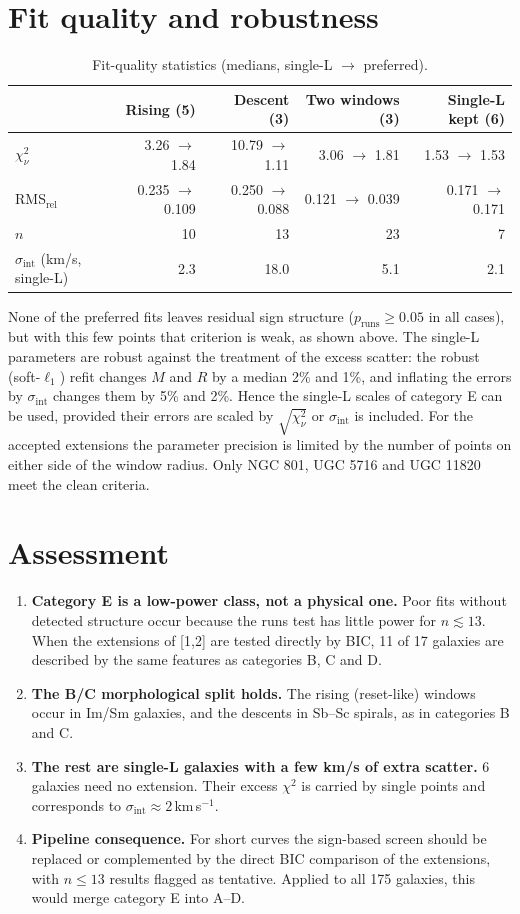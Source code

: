 \documentclass[10pt]{article}
\begin{document}
\section{Fit quality and robustness}
\begin{table}[h]\centering\small\caption{Fit-quality statistics (medians, single-L $\to$ preferred).}\begin{tabular}{lrrrr}\toprule & Rising (5) & Descent (3) & Two windows (3) & Single-L kept (6)\\\midrule
$\chi^2_\nu$ & 3.26 $\to$ 1.84 & 10.79 $\to$ 1.11 & 3.06 $\to$ 1.81 & 1.53 $\to$ 1.53\\
RMS$_\mathrm{rel}$ & 0.235 $\to$ 0.109 & 0.250 $\to$ 0.088 & 0.121 $\to$ 0.039 & 0.171 $\to$ 0.171\\
$n$ & 10 & 13 & 23 & 7\\
$\sigma_\mathrm{int}$ (km/s, single-L) & 2.3 & 18.0 & 5.1 & 2.1\\
\bottomrule\end{tabular}\end{table}
None of the preferred fits leaves residual sign structure ($p_\mathrm{runs}\ge0.05$ in all cases), but with this few points that criterion is weak, as shown above. The single-L parameters are robust against the treatment of the excess scatter: the robust (soft-$\ell_1$) refit changes $M$ and $R$ by a median 2\% and 1\%, and inflating the errors by $\sigma_\mathrm{int}$ changes them by 5\% and 2\%. Hence the single-L scales of category E can be used, provided their errors are scaled by $\sqrt{\chi^2_\nu}$ or $\sigma_\mathrm{int}$ is included. For the accepted extensions the parameter precision is limited by the number of points on either side of the window radius. Only NGC 801, UGC 5716 and UGC 11820 meet the clean criteria.
\section{Assessment}
\begin{enumerate}\itemsep1pt
\item \textbf{Category E is a low-power class, not a physical one.} Poor fits without detected structure occur because the runs test has little power for $n\lesssim13$. When the extensions of [1,2] are tested directly by BIC, 11 of 17 galaxies are described by the same features as categories B, C and D.
\item \textbf{The B/C morphological split holds.} The rising (reset-like) windows occur in Im/Sm galaxies, and the descents in Sb--Sc spirals, as in categories B and C.
\item \textbf{The rest are single-L galaxies with a few km/s of extra scatter.} 6 galaxies need no extension. Their excess $\chi^2$ is carried by single points and corresponds to $\sigma_\mathrm{int}\approx2$\,km\,s$^{-1}$.
\item \textbf{Pipeline consequence.} For short curves the sign-based screen should be replaced or complemented by the direct BIC comparison of the extensions, with $n\le13$ results flagged as tentative. Applied to all 175 galaxies, this would merge category E into A--D.
\end{enumerate}
\end{document}
